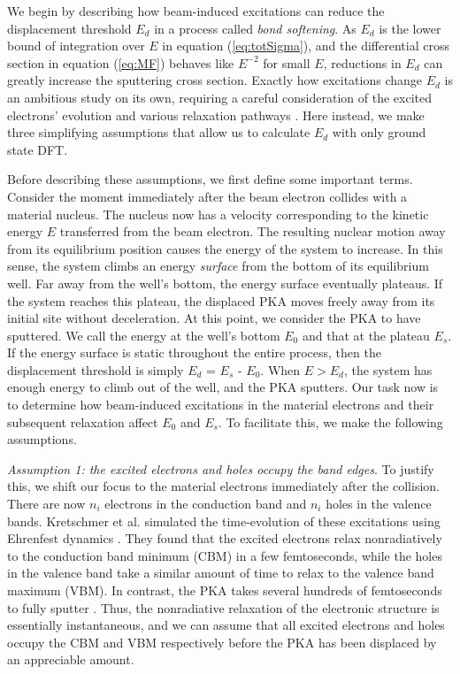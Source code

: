 \documentclass{article}
\begin{document}
We begin by describing how beam-induced excitations can reduce the
displacement threshold $E_d$ in a process called \textit{bond softening}.
As $E_d$ is the lower bound of integration over $E$ in equation
(\ref{eq:totSigma}), and the differential cross section in equation
(\ref{eq:MF}) behaves like $E^{-2}$ for small $E$, reductions in $E_d$ can
greatly increase the sputtering cross section.
Exactly how excitations change $E_d$ is an ambitious study on its own,
requiring a careful consideration of the excited electrons' evolution and
various relaxation pathways \cite{Lingerfelt2019a}.
Here instead, we make three simplifying assumptions that allow us to calculate
$E_d$ with only ground state DFT.

Before describing these assumptions, we first define some important terms.
Consider the moment immediately after the beam electron collides with a
material nucleus.
The nucleus now has a velocity corresponding to the kinetic energy
$E$ transferred from the beam electron.
The resulting nuclear motion away from its equilibrium position causes the
energy of the system to increase.
In this sense, the system climbs an energy \textit{surface} from the bottom of its
equilibrium well.
Far away from the well's bottom, the energy surface eventually plateaus.
If the system reaches this plateau, the displaced PKA moves
freely away from its initial site without deceleration. At this point, we
consider the PKA to have sputtered. We call the energy at the well's bottom
$E_0$ and that at the plateau $E_s$.
If the energy surface is static throughout the entire process, then the
displacement threshold is simply $E_d$ = $E_s$ - $E_0$.
When $E>E_d$, the system has enough energy to climb out of the well,
and the PKA sputters.  Our task now is to determine how beam-induced
excitations in the material electrons and their subsequent relaxation affect
$E_0$ and $E_s$.  To facilitate this, we make the following assumptions.

\medskip\noindent
\textit{Assumption 1: the excited electrons and holes occupy the band edges}.
To justify this, we shift our focus to the material electrons immediately after
the collision.  There are now $n_i$ electrons in the conduction band and $n_i$
holes in the valence bands.  Kretschmer et al. simulated the time-evolution of
these excitations using Ehrenfest dynamics \cite{Kretschmer2020,Li2005}.
They found that the excited electrons relax nonradiatively to the conduction
band minimum (CBM) in a few femtoseconds, while the holes in the valence band
take a similar amount of time to relax to the valence band maximum (VBM).
In contrast, the PKA takes several hundreds of femtoseconds to fully sputter
\cite{Yoshimura2018}.
Thus, the nonradiative relaxation of the electronic structure is essentially
instantaneous, and we can assume that all excited electrons and holes occupy
the CBM and VBM respectively before the PKA has been displaced by an
appreciable amount.
\end{document}
